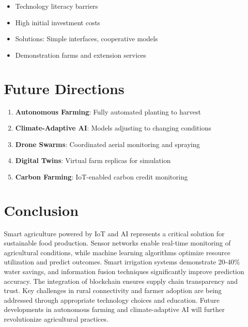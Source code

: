 \documentclass[12pt,a4paper]{article}
\begin{document}
\begin{itemize}
    \item Technology literacy barriers
    \item High initial investment costs
    \item Solutions: Simple interfaces, cooperative models
    \item Demonstration farms and extension services
\end{itemize}

\section{Future Directions}

\begin{enumerate}
    \item \textbf{Autonomous Farming}: Fully automated planting to harvest
    \item \textbf{Climate-Adaptive AI}: Models adjusting to changing conditions
    \item \textbf{Drone Swarms}: Coordinated aerial monitoring and spraying
    \item \textbf{Digital Twins}: Virtual farm replicas for simulation
    \item \textbf{Carbon Farming}: IoT-enabled carbon credit monitoring
\end{enumerate}

\section{Conclusion}

Smart agriculture powered by IoT and AI represents a critical solution for sustainable food production. Sensor networks enable real-time monitoring of agricultural conditions, while machine learning algorithms optimize resource utilization and predict outcomes. Smart irrigation systems demonstrate 20-40\% water savings, and information fusion techniques significantly improve prediction accuracy. The integration of blockchain ensures supply chain transparency and trust. Key challenges in rural connectivity and farmer adoption are being addressed through appropriate technology choices and education. Future developments in autonomous farming and climate-adaptive AI will further revolutionize agricultural practices.
\end{document}

